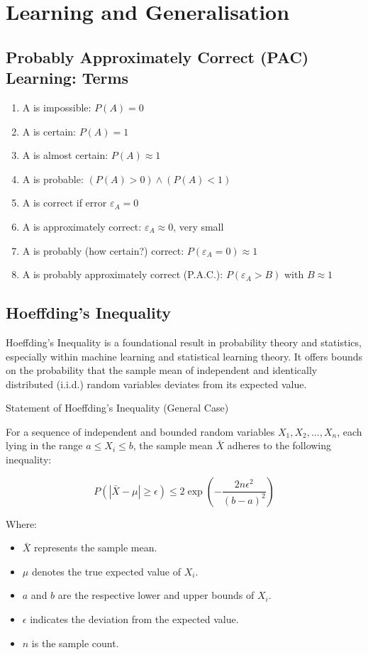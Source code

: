 \chapter{Learning and Generalisation}
\section{Probably Approximately Correct (PAC) Learning: Terms}
\begin{enumerate}
    \item A is impossible: $P(A) = 0$
    \item A is certain: $P(A) = 1$
    \item A is almost certain: $P(A) \approx 1$
    \item A is probable: $(P(A) > 0) \wedge (P(A) < 1)$
    \item A is correct if error $\varepsilon_A = 0$
    \item A is approximately correct: $\varepsilon_A \approx 0$, very small
    \item A is probably (how certain?) correct: $P(\varepsilon_A = 0) \approx 1$
    \item A is probably approximately correct (P.A.C.): $P(\varepsilon_A > B)$ with $B \approx 1$
\end{enumerate}

\section{Hoeffding's Inequality}

Hoeffding's Inequality is a foundational result in probability theory and statistics, especially within machine learning and statistical learning theory. It offers bounds on the probability that the sample mean of independent and identically distributed (i.i.d.) random variables deviates from its expected value.

\begin{sidenotebox}{Statement of Hoeffding's Inequality (General Case)}

For a sequence of independent and bounded random variables $X_1, X_2, \ldots, X_n$, each lying in the range $a \leq X_i \leq b$, the sample mean $\bar{X}$ adheres to the following inequality:

\begin{equation}
P\left(\left|\bar{X} - \mu\right| \geq \epsilon\right) \leq 2\exp\left(-\frac{2n\epsilon^2}{(b - a)^2}\right)
\end{equation}

Where:
\begin{itemize}   
\item  $\bar{X}$ represents the sample mean.
\item  $\mu$ denotes the true expected value of $X_i$.
\item  $a$ and $b$ are the respective lower and upper bounds of $X_i$.
\item  $\epsilon$ indicates the deviation from the expected value.
\item  $n$ is the sample count.
\end{itemize}
\end{sidenotebox}


